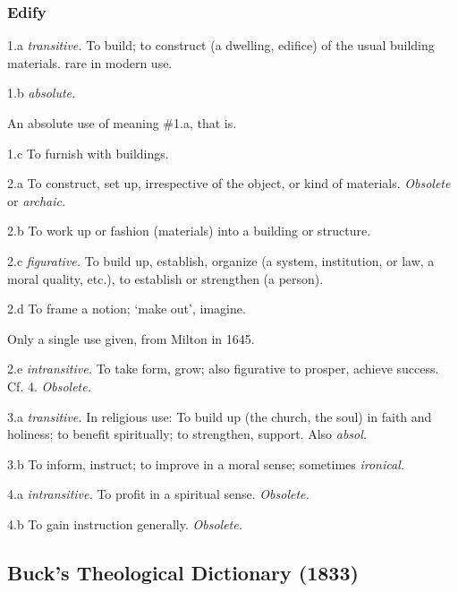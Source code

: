 	\subsubsection{Edify}

		\begin{compactitem}
			\item[1.a] \textit{transitive.} To build; to construct (a dwelling, edifice) of the usual building materials. rare in modern use.
			\item[1.b] \textit{absolute.}
				\begin{compactitem}
					\item An absolute use of meaning \#1.a, that is.
				\end{compactitem}
			\item[1.c] To furnish with buildings.
			\item[2.a] To construct, set up, irrespective of the object, or kind of materials. \textit{Obsolete} or \textit{archaic.}
			\item[2.b] To work up or fashion (materials) into a building or structure.
			\item[2.c] \textit{figurative.} To build up, establish, organize (a system, institution, or law, a moral quality, etc.), to establish or strengthen (a person).
			\item[2.d] To frame a notion; `make out', imagine.
				\begin{compactitem}
					\item Only a single use given, from Milton in 1645.
				\end{compactitem}
			\item[2.e] \textit{intransitive.} To take form, grow; also figurative to prosper, achieve success. Cf. 4. \textit{Obsolete.}
			\item[3.a] \textit{transitive.} In religious use: To build up (the church, the soul) in faith and holiness; to benefit spiritually; to strengthen, support. Also \textit{absol.}
			\item[3.b] To inform, instruct; to improve in a moral sense; sometimes \textit{ironical.}
			\item[4.a] \textit{intransitive.} To profit in a spiritual sense. \textit{Obsolete.}
			\item[4.b] To gain instruction generally. \textit{Obsolete.}
		\end{compactitem}
	
\subsection{Buck's Theological Dictionary (1833)} %
	\label{EDIFICATION-BTD}
	
